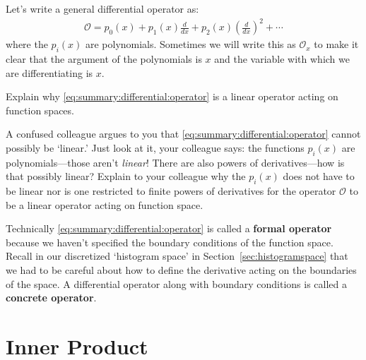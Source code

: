 Let's write a general differential operator as:
\begin{align}
  \mathcal O = 
  p_0(x) 
  + p_1(x) \frac{d}{dx}
  + p_2(x) \left(\frac{d}{dx}\right)^2
  + \cdots
  \label{eq:summary:differential:operator}
\end{align}
where the $p_i(x)$ are polynomials. Sometimes we will write this as $\mathcal O_x$ to make it clear that the argument of the polynomials is $x$ and the variable with which we are differentiating is $x$.  
\begin{exercise}
Explain why \eqref{eq:summary:differential:operator} is a linear operator acting on function spaces.
\end{exercise}
\begin{exercise}
A confused colleague argues to you that \eqref{eq:summary:differential:operator} cannot possibly be `linear.' Just look at it, your colleague says: the functions $p_i(x)$ are polynomials---those aren't \emph{linear}! There are also powers of derivatives---how is that possibly linear? Explain to your colleague why the $p_i(x)$ does not have to be linear nor is one restricted to finite powers of derivatives for the operator $\mathcal O$ to be a linear operator acting on function space.
\end{exercise}
Technically \eqref{eq:summary:differential:operator} is called a \textbf{formal operator} because we haven't specified the boundary conditions of the function space. Recall in our discretized `histogram space' in Section~\ref{sec:histogramspace} that we had to be careful about how to define the derivative acting on the boundaries of the space. A differential operator along with boundary conditions is called a \textbf{concrete operator}.

\section{Inner Product}

